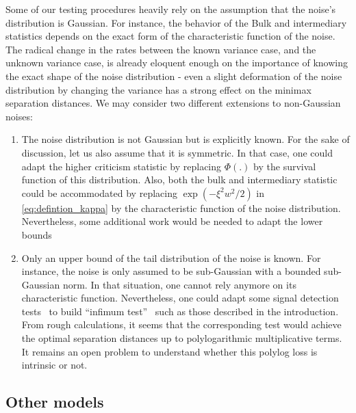 \documentclass[twoside,11pt]{article}
\newcommand{\<}{\langle}
\renewcommand{\>}{\rangle}
\begin{document}
Some of our testing procedures heavily rely on the assumption that the noise's distribution is Gaussian. For instance, the behavior of the Bulk and intermediary statistics depends on the exact form of the characteristic function of the noise. The radical change in the rates between the known variance case, and the unknown variance case, is already eloquent enough on the importance of knowing the exact shape of the noise distribution - even a slight deformation of the noise distribution by changing the variance has a strong effect on the minimax separation distances. We may consider two different extensions to non-Gaussian noises:
\begin{enumerate}
 \item The noise distribution is not Gaussian but is explicitly known. For the sake of discussion, let us also assume that it is symmetric. In that case, one could adapt the higher criticism statistic by replacing $\Phi(.)$ by the survival function of this distribution. Also, both the bulk and intermediary statistic could be accommodated by replacing $\exp(-\xi^2 w^2/2)$ in \eqref{eq:defintion_kappa} by the characteristic function of the noise distribution. Nevertheless, some additional work would be needed to adapt the lower bounds
 \item Only an upper bound of the tail distribution of the noise is known. For instance, the noise is only assumed to be sub-Gaussian with a bounded sub-Gaussian norm. In that situation, one cannot rely anymore on its characteristic function. Nevertheless, one could adapt some signal detection tests~\cite{baraud02} to build ``infimum test''~\cite{gayraud2005adaptive,nickl_vandegeer} such as those described in the introduction. From rough calculations, it seems that the corresponding test would achieve the optimal separation distances up to polylogarithmic multiplicative terms. It remains an open problem to understand whether this polylog loss is intrinsic or not. 
\end{enumerate}




\subsection{Other models}
\end{document}
